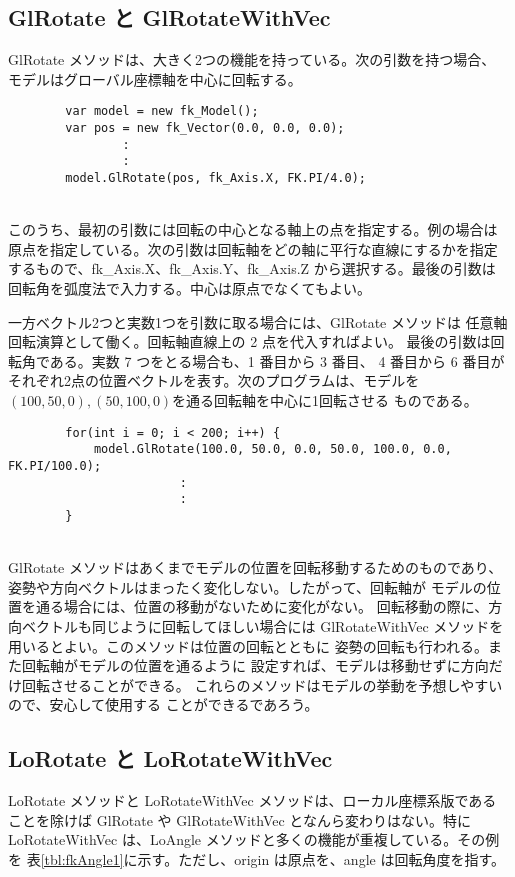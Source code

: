 \subsection{GlRotate と GlRotateWithVec}
GlRotate メソッドは、大きく2つの機能を持っている。次の引数を持つ場合、
モデルはグローバル座標軸を中心に回転する。
\\
\begin{breakbox}
\begin{verbatim}
        var model = new fk_Model();
        var pos = new fk_Vector(0.0, 0.0, 0.0);
                :
                :
        model.GlRotate(pos, fk_Axis.X, FK.PI/4.0);
\end{verbatim}
\end{breakbox}
~ \\
このうち、最初の引数には回転の中心となる軸上の点を指定する。例の場合は
原点を指定している。次の引数は回転軸をどの軸に平行な直線にするかを指定
するもので、fk\_Axis.X、fk\_Axis.Y、fk\_Axis.Z から選択する。最後の引数は
回転角を弧度法で入力する。中心は原点でなくてもよい。

一方ベクトル2つと実数1つを引数に取る場合には、GlRotate メソッドは
任意軸回転演算として働く。回転軸直線上の 2 点を代入すればよい。
最後の引数は回転角である。実数 7 つをとる場合も、1 番目から 3 番目、
4 番目から 6 番目がそれぞれ2点の位置ベクトルを表す。次のプログラムは、モデルを
\((100, 50, 0), (50, 100, 0)\)を通る回転軸を中心に1回転させる
ものである。
\\
\begin{breakbox}
\begin{verbatim}
        for(int i = 0; i < 200; i++) {
            model.GlRotate(100.0, 50.0, 0.0, 50.0, 100.0, 0.0, FK.PI/100.0);
                        :
                        :
        }
\end{verbatim}
\end{breakbox}
~ \\
GlRotate メソッドはあくまでモデルの位置を回転移動するためのものであり、
姿勢や方向ベクトルはまったく変化しない。したがって、回転軸が
モデルの位置を通る場合には、位置の移動がないために変化がない。
回転移動の際に、方向ベクトルも同じように回転してほしい場合には
GlRotateWithVec メソッドを用いるとよい。このメソッドは位置の回転とともに
姿勢の回転も行われる。また回転軸がモデルの位置を通るように
設定すれば、モデルは移動せずに方向だけ回転させることができる。
これらのメソッドはモデルの挙動を予想しやすいので、安心して使用する
ことができるであろう。

\subsection{LoRotate と LoRotateWithVec}
LoRotate メソッドと LoRotateWithVec メソッドは、ローカル座標系版である
ことを除けば GlRotate や GlRotateWithVec となんら変わりはない。特に
LoRotateWithVec は、LoAngle メソッドと多くの機能が重複している。その例を
表\ref{tbl:fkAngle1}に示す。ただし、origin は原点を、angle は回転角度を指す。

